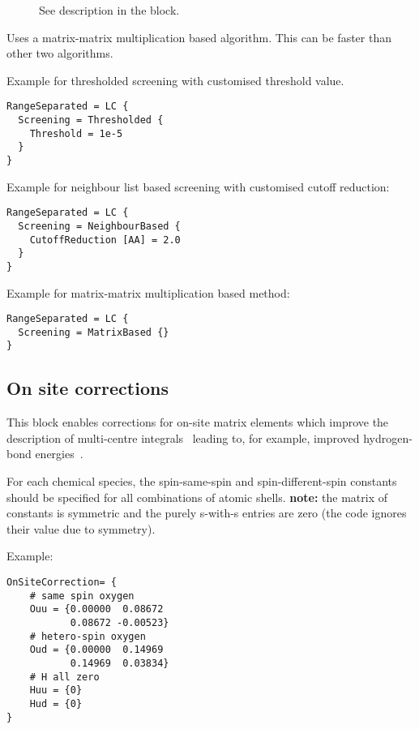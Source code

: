 \begin{description}
\begin{description}
    \begin{description}
    \item[] See description in the
       block.
    \end{description}


  \item[\is{MatrixBased}] Uses a matrix-matrix multiplication based algorithm. This
    can be faster than other two algorithms.
  \end{description}
\end{description}

Example for thresholded screening with customised threshold value.
\begin{verbatim}
RangeSeparated = LC {
  Screening = Thresholded {
    Threshold = 1e-5
  }
}
\end{verbatim}

Example for neighbour list based screening with customised cutoff reduction:
\begin{verbatim}
RangeSeparated = LC {
  Screening = NeighbourBased {
    CutoffReduction [AA] = 2.0
  }
}
\end{verbatim}

Example for matrix-matrix multiplication based method:
\begin{verbatim}
RangeSeparated = LC {
  Screening = MatrixBased {}
}
\end{verbatim}


\subsection{On site corrections}
\label{sec:dftbp.Onsites}

This block enables corrections for on-site matrix elements which improve the
description of multi-centre integrals~\cite{garcia14Thesis} leading to, for
example, improved hydrogen-bond energies~\cite{dominguez15}. 

For each chemical species, the spin-same-spin and spin-different-spin constants
should be specified for all combinations of atomic shells. {\bf note:} the
matrix of constants is symmetric and the purely s-with-s entries are zero (the
code ignores their value due to symmetry).

Example:
\begin{verbatim}
OnSiteCorrection= {
    # same spin oxygen
    Ouu = {0.00000  0.08672
           0.08672 -0.00523}
    # hetero-spin oxygen
    Oud = {0.00000  0.14969
           0.14969  0.03834}
    # H all zero
    Huu = {0}
    Hud = {0}
}
\end{verbatim}

